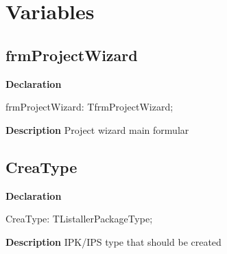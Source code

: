\documentclass{report}
\newif\ifpdf
\begin{document}
\section{Variables}
\ifpdf
\subsection*{\large{\textbf{frmProjectWizard}}\normalsize\hspace{1ex}\hrulefill}
\else
\subsection*{frmProjectWizard}
\fi
\label{prjwizard-frmProjectWizard}
\begin{list}{}{
\setlength{\itemindent}{0cm}
\setlength{\listparindent}{0cm}
\setlength{\leftmargin}{\evensidemargin}
\addtolength{\leftmargin}{\tmplength}
\settowidth{\labelsep}{X}
\addtolength{\leftmargin}{\labelsep}
\setlength{\labelwidth}{\tmplength}
}
\item[\textbf{Declaration}\hfill]
\ifpdf
\begin{flushleft}
\fi
\begin{ttfamily}
frmProjectWizard: TfrmProjectWizard;\end{ttfamily}

\ifpdf
\end{flushleft}
\fi

\par
\item[\textbf{Description}]
Project wizard main formular

\end{list}
\ifpdf
\subsection*{\large{\textbf{CreaType}}\normalsize\hspace{1ex}\hrulefill}
\else
\subsection*{CreaType}
\fi
\label{prjwizard-CreaType}
\begin{list}{}{
\setlength{\itemindent}{0cm}
\setlength{\listparindent}{0cm}
\setlength{\leftmargin}{\evensidemargin}
\addtolength{\leftmargin}{\tmplength}
\settowidth{\labelsep}{X}
\addtolength{\leftmargin}{\labelsep}
\setlength{\labelwidth}{\tmplength}
}
\item[\textbf{Declaration}\hfill]
\ifpdf
\begin{flushleft}
\fi
\begin{ttfamily}
CreaType: TListallerPackageType;\end{ttfamily}

\ifpdf
\end{flushleft}
\fi

\par
\item[\textbf{Description}]
IPK/IPS type that should be created

\end{list}
\end{document}
